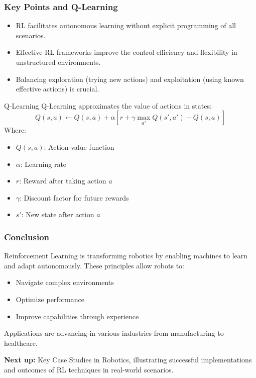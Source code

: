 \documentclass[aspectratio=169]{beamer}
\begin{document}
\begin{frame}[fragile]
    \frametitle{Key Points and Q-Learning}
    \begin{itemize}
        \item RL facilitates autonomous learning without explicit programming of all scenarios.
        \item Effective RL frameworks improve the control efficiency and flexibility in unstructured environments.
        \item Balancing exploration (trying new actions) and exploitation (using known effective actions) is crucial.
    \end{itemize}

    \begin{block}{Q-Learning}
        Q-Learning approximates the value of actions in states:
        \begin{equation}
            Q(s, a) \gets Q(s, a) + \alpha \left[ r + \gamma \max_{a'} Q(s', a') - Q(s, a) \right]
        \end{equation}
        Where:
        \begin{itemize}
            \item \( Q(s, a) \): Action-value function
            \item \( \alpha \): Learning rate
            \item \( r \): Reward after taking action \( a \)
            \item \( \gamma \): Discount factor for future rewards
            \item \( s' \): New state after action \( a \)
        \end{itemize}
    \end{block}
\end{frame}

\begin{frame}[fragile]
    \frametitle{Conclusion}
    Reinforcement Learning is transforming robotics by enabling machines to learn and adapt autonomously. These principles allow robots to:
    \begin{itemize}
        \item Navigate complex environments
        \item Optimize performance
        \item Improve capabilities through experience
    \end{itemize}
    Applications are advancing in various industries from manufacturing to healthcare.

    \textbf{Next up:} Key Case Studies in Robotics, illustrating successful implementations and outcomes of RL techniques in real-world scenarios.
\end{frame}
\end{document}
